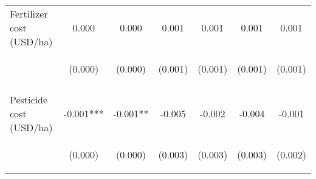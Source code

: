 \begin{center}
\begin{tabular}{lcccccc}
Fertilizer cost (USD/ha) & 0.000 & 0.000 & 0.001 & 0.001 & 0.001 & 0.001 \\
 & \begin{footnotesize}(0.000)\end{footnotesize} & \begin{footnotesize}(0.000)\end{footnotesize} & \begin{footnotesize}(0.001)\end{footnotesize} & \begin{footnotesize}(0.001)\end{footnotesize} & \begin{footnotesize}(0.001)\end{footnotesize} & \begin{footnotesize}(0.001)\end{footnotesize} \\
\vspace{4pt} & \begin{footnotesize}[0.726]\end{footnotesize} & \begin{footnotesize}[0.590]\end{footnotesize} & \begin{footnotesize}[0.210]\end{footnotesize} & \begin{footnotesize}[0.145]\end{footnotesize} & \begin{footnotesize}[0.223]\end{footnotesize} & \begin{footnotesize}[0.152]\end{footnotesize} \\
Pesticide cost (USD/ha) & -0.001*** & -0.001** & -0.005 & -0.002 & -0.004 & -0.001 \\
 & \begin{footnotesize}(0.000)\end{footnotesize} & \begin{footnotesize}(0.000)\end{footnotesize} & \begin{footnotesize}(0.003)\end{footnotesize} & \begin{footnotesize}(0.003)\end{footnotesize} & \begin{footnotesize}(0.003)\end{footnotesize} & \begin{footnotesize}(0.002)\end{footnotesize} \\

\end{tabular}
\end{center}
